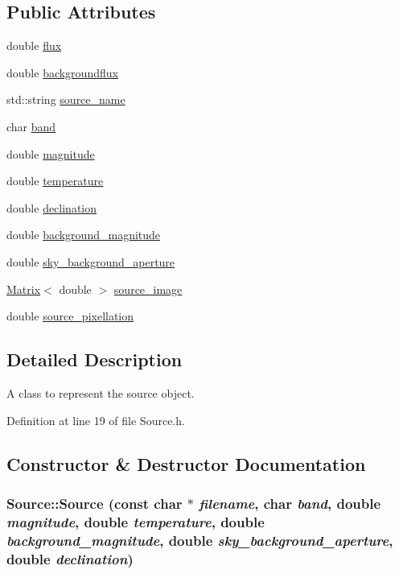 \subsection*{Public Attributes}
\begin{DoxyCompactItemize}
\item 
double \hyperlink{classSource_a8888be0016028aa59006fa6d9fc7c575}{flux}
\item 
double \hyperlink{classSource_ac6515686d4bbb766ae14e1360fdf1c97}{backgroundflux}
\item 
std::string \hyperlink{classSource_aca080db4a19c5a8c149b6362aedcb0cd}{source\_\-name}
\item 
char \hyperlink{classSource_a380447fc2b80c1b6bc5c2a8b31ed6b98}{band}
\item 
double \hyperlink{classSource_a6a63845ae2495f7d0b9758e969ae34a5}{magnitude}
\item 
double \hyperlink{classSource_a01ad608788eb4c0e4a7b2a6228398394}{temperature}
\item 
double \hyperlink{classSource_acd65dbd79034b6bd27ce7bea9cddf80b}{declination}
\item 
double \hyperlink{classSource_af8077dd4bf90295d11680d6dbd0baea9}{background\_\-magnitude}
\item 
double \hyperlink{classSource_aa21a6313f7ab7c41bb206ed05f0909cc}{sky\_\-background\_\-aperture}
\item 
\hyperlink{classMatrix}{Matrix}$<$ double $>$ \hyperlink{classSource_ae39e6de7004f8f12968f38352c6c0f5e}{source\_\-image}
\item 
double \hyperlink{classSource_ad8a9910f6a3d807ac0e1b42195ba4147}{source\_\-pixellation}
\end{DoxyCompactItemize}


\subsection{Detailed Description}
A class to represent the source object. 

Definition at line 19 of file Source.h.



\subsection{Constructor \& Destructor Documentation}
\hypertarget{classSource_aba8cb9f6fa274c8079bd5715850bf967}{
\subsubsection[{Source}]{\setlength{\rightskip}{0pt plus 5cm}Source::Source (const char $\ast$ {\em filename}, \/  char {\em band}, \/  double {\em magnitude}, \/  double {\em temperature}, \/  double {\em background\_\-magnitude}, \/  double {\em sky\_\-background\_\-aperture}, \/  double {\em declination})}}
\label{classSource_aba8cb9f6fa274c8079bd5715850bf967}


